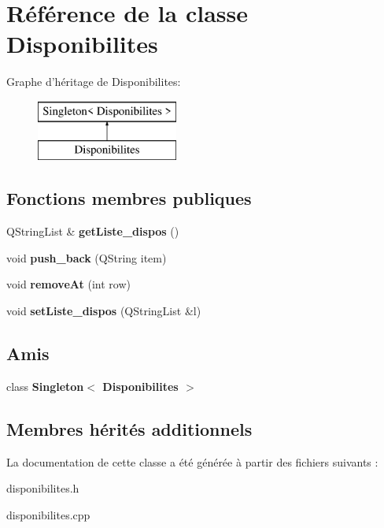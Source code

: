 \hypertarget{class_disponibilites}{\section{Référence de la classe Disponibilites}
\label{class_disponibilites}
}
Graphe d'héritage de Disponibilites\+:\begin{figure}[H]
\begin{center}
\leavevmode
\includegraphics[height=2.000000cm]{class_disponibilites}
\end{center}
\end{figure}
\subsection*{Fonctions membres publiques}
\begin{DoxyCompactItemize}
\item 
\hypertarget{class_disponibilites_a7a0c84d0b8731cbd55209ed928d1799f}{Q\+String\+List \& {\bfseries get\+Liste\+\_\+dispos} ()}\label{class_disponibilites_a7a0c84d0b8731cbd55209ed928d1799f}

\item 
\hypertarget{class_disponibilites_a7c9c7950057ae4c31eeb589a35bea28a}{void {\bfseries push\+\_\+back} (Q\+String item)}\label{class_disponibilites_a7c9c7950057ae4c31eeb589a35bea28a}

\item 
\hypertarget{class_disponibilites_aa109462728f928dee2a2f96324ae8b85}{void {\bfseries remove\+At} (int row)}\label{class_disponibilites_aa109462728f928dee2a2f96324ae8b85}

\item 
\hypertarget{class_disponibilites_abbc56d1b6926971fd3f6dc626bcd1c08}{void {\bfseries set\+Liste\+\_\+dispos} (Q\+String\+List \&l)}\label{class_disponibilites_abbc56d1b6926971fd3f6dc626bcd1c08}

\end{DoxyCompactItemize}
\subsection*{Amis}
\begin{DoxyCompactItemize}
\item 
\hypertarget{class_disponibilites_aaf5bfd019b36b22eec3a2add26a4bab6}{class {\bfseries Singleton$<$ Disponibilites $>$}}\label{class_disponibilites_aaf5bfd019b36b22eec3a2add26a4bab6}

\end{DoxyCompactItemize}
\subsection*{Membres hérités additionnels}


La documentation de cette classe a été générée à partir des fichiers suivants \+:\begin{DoxyCompactItemize}
\item 
disponibilites.\+h\item 
disponibilites.\+cpp\end{DoxyCompactItemize}

